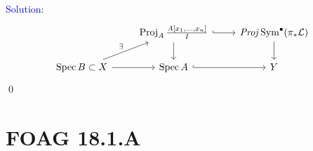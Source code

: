 \documentclass[11pt]{article}
\newcommand{\cL}{\mathcal{L}}
\DeclareMathOperator{\Spec}{\operatorname{Spec}}
\newcommand{\Proj}{\operatorname{Proj}}
\newcommand{\PROJ}{\mathit{Proj}}
\newcommand{\Sym}{\operatorname{Sym}}
\newenvironment{solution}{\begin{trivlist}\item[]{\textcolor{blue}{Solution:}}}{\qed \end{trivlist}}
\begin{document}
\begin{solution}
    \[\begin{tikzcd}
        & {\Proj_A \frac{A[x_1, \ldots, x_n]}{I}} & {\PROJ \Sym^{\bullet} (\pi_* \cL)} \\
        {\Spec B \subset X} & {\Spec A} & Y
        \arrow[hook, from=1-2, to=1-3]
        \arrow[from=1-2, to=2-2]
        \arrow[from=1-3, to=2-3]
        \arrow["\exists", from=2-1, to=1-2]
        \arrow[from=2-1, to=2-2]
        \arrow[hook, from=2-2, to=2-3]
    \end{tikzcd}\]
\end{solution}

\newpage

\section*{FOAG 18.1.A}
\end{document}
